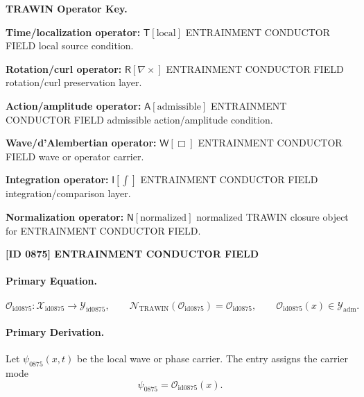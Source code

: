 \par\vspace{0.45\baselineskip}
\noindent\begin{minipage}[t]{\linewidth}
\begingroup
\small
\raggedright
\textbf{TRAWIN Operator Key.}\par
\noindent\textbf{Time/localization operator:} $\mathsf{T}\!\left[\mathrm{local}\right]$ ENTRAINMENT CONDUCTOR FIELD local source condition.\par
\noindent\textbf{Rotation/curl operator:} $\mathsf{R}\!\left[\nabla\times\right]$ ENTRAINMENT CONDUCTOR FIELD rotation/curl preservation layer.\par
\noindent\textbf{Action/amplitude operator:} $\mathsf{A}\!\left[\mathrm{admissible}\right]$ ENTRAINMENT CONDUCTOR FIELD admissible action/amplitude condition.\par
\noindent\textbf{Wave/d'Alembertian operator:} $\mathsf{W}\!\left[\Box\right]$ ENTRAINMENT CONDUCTOR FIELD wave or operator carrier.\par
\noindent\textbf{Integration operator:} $\mathsf{I}\!\left[\int\right]$ ENTRAINMENT CONDUCTOR FIELD integration/comparison layer.\par
\noindent\textbf{Normalization operator:} $\mathsf{N}\!\left[\mathrm{normalized}\right]$ normalized TRAWIN closure object for ENTRAINMENT CONDUCTOR FIELD.\par
\endgroup
\end{minipage}

\clearpage
\noindent\textbf{[ID 0875] ENTRAINMENT CONDUCTOR FIELD}\par
\vspace{0.35em}
\paragraph{Primary Equation.}
\[
\mathcal{O}_{\mathrm{id0875}}:\mathcal{X}_{\mathrm{id0875}}\longrightarrow \mathcal{Y}_{\mathrm{id0875}},\qquad
\mathcal{N}_{\mathrm{TRAWIN}}(\mathcal{O}_{\mathrm{id0875}})=\mathcal{O}_{\mathrm{id0875}},\qquad
\mathcal{O}_{\mathrm{id0875}}(x)\in\mathcal{Y}_{\mathrm{adm}}.
\]

\paragraph{Primary Derivation.} Let $\psi_{0875}(x,t)$ be the local wave or phase carrier.  The entry assigns the carrier mode\[
\psi_{0875}=\mathcal{O}_{\mathrm{id0875}}(x).
\]

